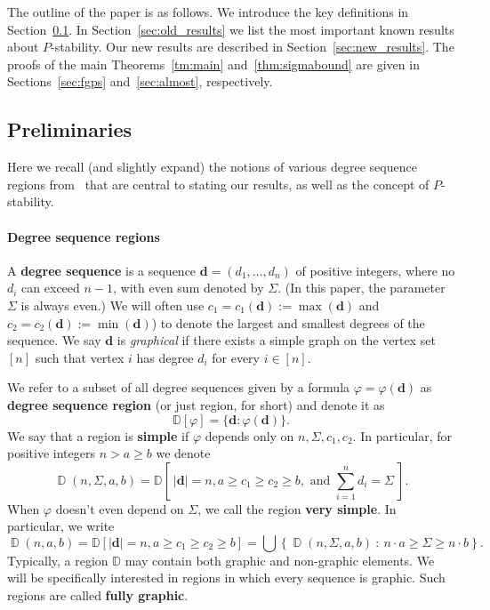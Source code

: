 \documentclass[11pt]{elsarticle}
\theoremstyle{plain}
\theoremstyle{definition}
\def\mD{\mathbb{D}}
\newcommand{\dd}[3]{\operatorname{\mathbb D}(#1,#2,#3)}
\newcommand{\dds}[4]{\operatorname{\mathbb D}(#1,#2,#3,#4)}
\begin{document}
The outline of the paper is as follows. We introduce the key definitions in Section~\ref{sec:prelim}. In Section~\ref{sec:old_results} we list the most important known results about $P$-stability. Our new results are described in Section~\ref{sec:new_results}. The proofs of the main Theorems~\ref{tm:main} and~\ref{thm:sigmabound} are given in Sections~\ref{sec:fgps} and~\ref{sec:almost}, respectively.

\subsection{Preliminaries}\label{sec:prelim}


Here we recall (and slightly expand) the notions of various degree sequence regions from~\cite{fully} that are central to stating our results, as well as the concept of $P$-stability.

\paragraph{Degree sequence regions} A \textbf{degree sequence} is a sequence $\mathbf{d} = (d_1, \ldots , d_n)$ of positive integers, where no $d_i$ can exceed $n-1$, with even sum denoted by $\Sigma$. (In this paper, the parameter $\Sigma$ is always even.) We will often use $c_1 = c_1(\mathbf{d}) := \max (\mathbf{d})$ and $c_2 = c_2(\mathbf{d}) := \min (\mathbf{d})$) to denote the largest and smallest degrees of the sequence. We say $\mathbf{d}$ is \emph{graphical} if there exists a simple graph on the vertex set $[n]$ such that vertex $i$ has degree $d_i$ for every $i \in [n].$

We refer to a subset of all degree sequences given by a formula $\varphi = \varphi(\mathbf{d})$ as \textbf{degree sequence region} (or just region, for short) and denote it as
\begin{equation}
  \mD[\varphi] = \{ \mathbf{d} : \varphi(\mathbf{d})\}.
\end{equation}
We say that a region is \textbf{simple} if $\varphi$ depends only on $n, \Sigma, c_1, c_2$. In particular, for positive integers $n > a \geq b$ we denote
\begin{equation}\label{eq:VSR}
\dds{n}{\Sigma}{a}{b}=\mD\left[\ |\mathbf{d}|=n, a \geq c_1 \geq c_2 \geq b, \mbox{ and } {\textstyle\sum_{i=1}^n}d_i=\Sigma\ \right].
\end{equation}
When $\varphi$ doesn't even depend on $\Sigma$, we call the region \textbf{very simple}. In particular, we write
\begin{equation}\label{eq:SR}
\dd{n}{a}{b}= \mD[|\mathbf{d}|=n, a\geq c_1 \geq c_2 \geq b] = \bigcup \left\{\dds{n}{\Sigma}{a}{b}\ : \ n\cdot a\ge \Sigma \ge n\cdot b \right \}.
\end{equation}
Typically, a region $\mD$ may contain both graphic and non-graphic elements. We will be specifically interested in regions in which every sequence is graphic. Such regions are called \textbf{fully graphic}.
\end{document}
